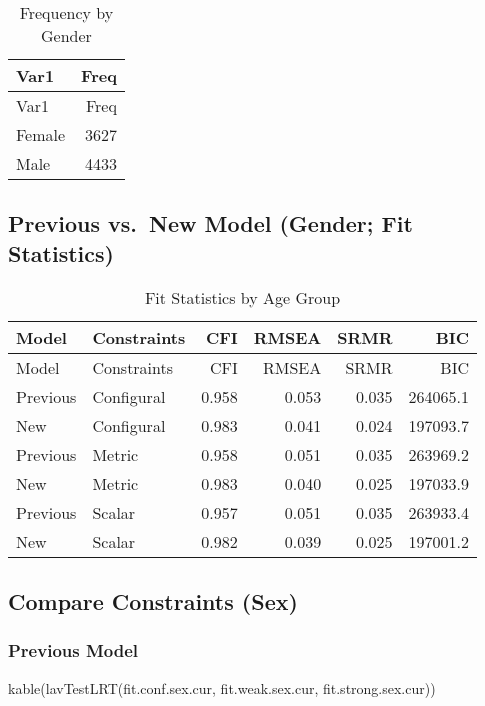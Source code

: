 \documentclass[
  letterpaper,
  DIV=11,
  numbers=noendperiod]{scrartcl}
\newenvironment{Shaded}{\begin{snugshade}}{\end{snugshade}}
\newcommand{\FunctionTok}[1]{\textcolor[rgb]{0.28,0.35,0.67}{#1}}
\newcommand{\NormalTok}[1]{\textcolor[rgb]{0.00,0.23,0.31}{#1}}
\begin{document}
\begin{longtable}[]{@{}lr@{}}
\caption{Frequency by Gender}\tabularnewline
\toprule\noalign{}
Var1 & Freq \\
\midrule\noalign{}
\endfirsthead
\toprule\noalign{}
Var1 & Freq \\
\midrule\noalign{}
\endhead
\bottomrule\noalign{}
\endlastfoot
Female & 3627 \\
Male & 4433 \\
\end{longtable}

\subsection{Previous vs.~New Model (Gender; Fit
Statistics)}\label{previous-vs.-new-model-gender-fit-statistics}

\begin{longtable}[]{@{}llrrrr@{}}
\caption{Fit Statistics by Age Group}\tabularnewline
\toprule\noalign{}
Model & Constraints & CFI & RMSEA & SRMR & BIC \\
\midrule\noalign{}
\endfirsthead
\toprule\noalign{}
Model & Constraints & CFI & RMSEA & SRMR & BIC \\
\midrule\noalign{}
\endhead
\bottomrule\noalign{}
\endlastfoot
Previous & Configural & 0.958 & 0.053 & 0.035 & 264065.1 \\
New & Configural & 0.983 & 0.041 & 0.024 & 197093.7 \\
Previous & Metric & 0.958 & 0.051 & 0.035 & 263969.2 \\
New & Metric & 0.983 & 0.040 & 0.025 & 197033.9 \\
Previous & Scalar & 0.957 & 0.051 & 0.035 & 263933.4 \\
New & Scalar & 0.982 & 0.039 & 0.025 & 197001.2 \\
\end{longtable}

\subsection{Compare Constraints (Sex)}\label{compare-constraints-sex}

\subsubsection{Previous Model}\label{previous-model-2}

\begin{Shaded}
\begin{Highlighting}[]
\FunctionTok{kable}\NormalTok{(}\FunctionTok{lavTestLRT}\NormalTok{(fit.conf.sex.cur, }
\NormalTok{                 fit.weak.sex.cur, }
\NormalTok{                 fit.strong.sex.cur))}
\end{Highlighting}
\end{Shaded}
\end{document}
